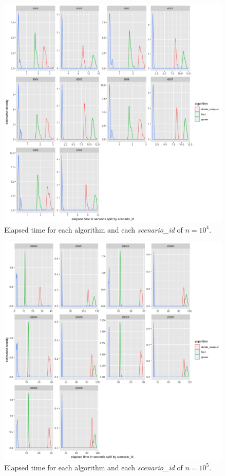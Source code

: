 \documentclass[11pt]{report}
\begin{document}
\begin{figure}[!ht]
\centering
    \includegraphics{./images/elapsed_time_10000.png}
    \caption{Elapsed time for each algorithm and each \textit{scenario\_id} of $n=10^4$.}
    \label{elapsed_time_10000}
\end{figure}

\begin{figure}[!ht]
\centering
    \includegraphics{./images/elapsed_time_100000.png}
    \caption{Elapsed time for each algorithm and each \textit{scenario\_id} of $n=10^5$.}
    \label{elapsed_time_100000}
\end{figure}
\end{document}
